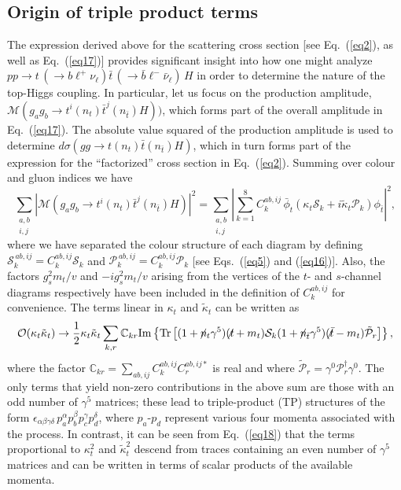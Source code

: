 \documentclass[aps,preprint,tightenlines,floatfix,superscriptaddress,nofootinbib,showpacs]{revtex4-1}
\def\beq{\begin{equation}}
\def\eeq{\end{equation}}
\def\tbslash{\tbar\hspace{-10pt}\not{}\hspace{4pt}}
\def\tslash{t\hspace{-10pt}\not{}\hspace{4pt}}
\def\nslash{n\hspace{-10pt}\not{}\hspace{4pt}}
\def\tbar{\bar{t}}
\def\bbar{\bar{b}}
\def\nubar{{\bar{\nu}}_{\ell}}
\def\ppprocess{pp\to t\,\left(\rightarrow b {\ell}^+ \nu_{\ell}\right) \tbar\,\left(\rightarrow\bbar {\ell}^-\nubar\right)\,H}
\def\kp{\kappa_t}
\def\kpt{\tilde{\kappa}_t}
\begin{document}
\subsection{Origin of triple product terms}
\label{subsec:origin}

The expression derived above for the scattering cross
section [see Eq.~(\ref{eq2}), as well as Eq.~(\ref{eq17})]
provides significant insight into
how one might analyze $\ppprocess$ in order to determine
the nature of the top-Higgs coupling.  In particular,
let us focus on the production amplitude,
$\mathcal{M}(g_ag_b \to t^i(n_t)\tbar^j(n_{\tbar})H))$, which forms
part of the overall amplitude in Eq.~(\ref{eq17}).
The absolute value squared of the production amplitude
is used to determine $d\sigma(gg\to t(n_t)\tbar (n_{\tbar})H)$,
which in turn forms part of the expression for the ``factorized'' cross section
in Eq.~(\ref{eq2}).  Summing over colour and gluon indices
we have
%
\beq
\label{eq18}
\sum_{\substack{a,b \\ i,j}}|\mathcal{M}(g_ag_b \to t^i(n_t)\tbar^j(n_{\tbar})H)|^2=\sum_{\substack{a,b \\ i,j}}\left|\sum^{8}_{k=1}C^{ab,ij}_k\,\bar{\phi}_t (\kp\mathcal{S}_k+i\kpt\mathcal{P}_k)\phi_{\tbar}\right|^2,
\eeq
%
where we have separated the colour structure of each diagram by defining
$\mathcal{S}^{\,ab,ij}_k= C^{ab,ij}_k \mathcal{S}_k$ and
$\mathcal{P}^{\,ab,ij}_k= C^{ab,ij}_k \mathcal{P}_k$
[see Eqs.~(\ref{eq5}) and (\ref{eq16})]. Also, the factors
$g^2_s m_t/v$ and $-ig^2_s m_t/v$ arising from the vertices of the $t$-
and $s$-channel diagrams respectively have been included in the
definition of $C^{ab,ij}_k$ for convenience. The terms linear in $\kp$
and $\kpt$ can be written as
%
\beq
\label{eq19}
\mathcal{O}(\kp\kpt)\to \frac{1}{2}\kp\kpt \sum_{k,r}\mathbb{C}_{kr}\mathrm{Im}
\left\lbrace \mathrm{Tr}\left[ (1+\nslash_t \gamma^5)(\tslash+m_t)\mathcal{S}_k(1+\nslash_{\tbar}\gamma^5
 )(\tbslash -m_t)\tilde{\mathcal{P}}_r \right] \right\rbrace ,
\eeq
%
where the factor $\mathbb{C}_{kr}=\sum_{ab,ij}C^{ab,ij}_k
C^{ab,ij*}_r$ is real and where $\tilde{\mathcal{P}}_r = \gamma^0
\mathcal{P}^{\dagger}_r \gamma^0$.
The only terms that yield non-zero contributions
in the above sum are those with an
odd number of $\gamma^5$ matrices; these lead to triple-product
(TP) structures
of the form $\epsilon_{\alpha\beta\gamma\delta}\,p^{\alpha}_ap^{\beta}_bp^{\gamma}_cp^{\delta}_d$,
where $p_a$-$p_d$ represent various four momenta associated with the process.
In contrast,
it can be seen from Eq.~(\ref{eq18}) that the terms proportional to
$\kp^2$ and $\tilde{\kappa}^2_t$ descend from traces containing
an even number of $\gamma^5$
matrices and can be written in terms of scalar products of the
available momenta.\par
\end{document}
